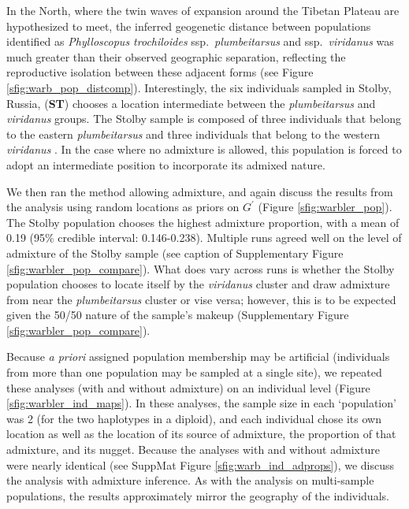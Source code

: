 \documentclass[12pt]{article}
\begin{document}
In the North, where the twin waves of expansion around the Tibetan Plateau are hypothesized to meet, the inferred geogenetic distance between populations identified as \textit{Phylloscopus trochiloides} ssp.\ \textit{plumbeitarsus} and ssp.\ \textit{viridanus} was much greater than their observed geographic separation, reflecting the reproductive isolation between these adjacent forms (see Figure \ref{sfig:warb_pop_distcomp}).  Interestingly, the six individuals sampled in Stolby, Russia, (\textbf{ST}) chooses a location intermediate between the \textit{plumbeitarsus} and \textit{viridanus} groups. The Stolby sample is composed of three individuals that belong to the eastern \textit{plumbeitarsus} and three individuals that belong to the western \textit{viridanus} \citep{alcaide2014genomic}. In the case where no admixture is allowed, this population is forced to adopt an intermediate position to incorporate its admixed nature.


We then ran the method allowing admixture, and again discuss the results from the analysis using random locations as priors on $G^{\prime}$ (Figure \ref{sfig:warbler_pop}). The Stolby population chooses the highest admixture proportion, with a mean of 0.19 (95\% credible interval: 0.146-0.238).  Multiple runs agreed well on the level of admixture of the Stolby sample (see caption of Supplementary Figure \ref{sfig:warbler_pop_compare}). What does vary across runs is whether the Stolby population chooses to locate itself by the \textit{viridanus} cluster and draw admixture from near the \textit{plumbeitarsus}  cluster or vise versa; however, this is to be expected given the 50/50 nature of the sample's makeup (Supplementary Figure \ref{sfig:warbler_pop_compare}).

Because \textit{a priori} assigned population membership may be artificial (individuals from more than one population may be sampled at a single site), we repeated these analyses (with and without admixture) on an individual level (Figure \ref{sfig:warbler_ind_maps}).  In these analyses, the sample size in each `population' was 2 (for the two haplotypes in a diploid), and each individual chose its own location as well as the location of its source of admixture, the proportion of that admixture, and its nugget.  
Because the analyses with and without admixture were nearly identical 
(see SuppMat Figure \ref{sfig:warb_ind_adprops}),
we discuss the analysis with admixture inference.  As with the analysis on multi-sample populations, the results approximately mirror the geography of the individuals.
\end{document}
